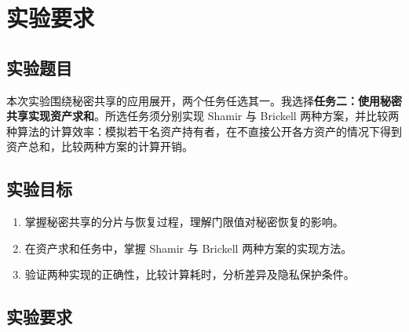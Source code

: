 \documentclass{SYSUReport}
\date{2026 年 10 月 20 日}
\begin{document}
\cover
\thispagestyle{empty}
\clearpage

\tableofcontents
\clearpage

\section{实验要求}

\subsection{实验题目}

本次实验围绕秘密共享的应用展开，两个任务任选其一。我选择\textbf{任务二：使用秘密共享实现资产求和}。所选任务须分别实现 Shamir 与 Brickell 两种方案，并比较两种算法的计算效率：模拟若干名资产持有者，在不直接公开各方资产的情况下得到资产总和，比较两种方案的计算开销。

\subsection{实验目标}

\begin{enumerate}
    \item 掌握秘密共享的分片与恢复过程，理解门限值对秘密恢复的影响。
    \item 在资产求和任务中，掌握 Shamir 与 Brickell 两种方案的实现方法。
    \item 验证两种实现的正确性，比较计算耗时，分析差异及隐私保护条件。
\end{enumerate}

\subsection{实验要求}
\end{document}
